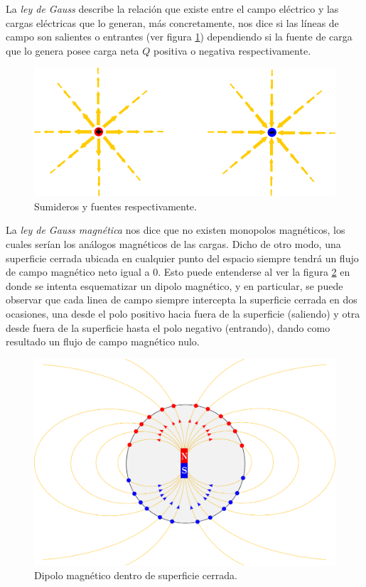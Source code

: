 La \textit{ley de Gauss} describe la relación que existe entre el campo eléctrico y las cargas eléctricas que lo generan, más concretamente, nos dice si las líneas de campo son salientes o entrantes (ver figura \ref{fig:2}) dependiendo si la fuente de carga que lo genera posee carga neta $Q$ positiva o negativa respectivamente.
\begin{figure}[!ht]
\centering
\includegraphics[scale=1]{images/sumidero-fuente.pdf}
\caption[Ley de Gauss]{Sumideros y fuentes respectivamente.}
\label{fig:2}
\end{figure}

La \textit{ley de Gauss magnética} nos dice que no existen monopolos magnéticos, los cuales serían los análogos magnéticos de las cargas. Dicho de otro modo, una superficie cerrada ubicada en cualquier punto del espacio siempre tendrá un flujo de campo magnético neto igual a 0. Esto puede entenderse al ver la figura \ref{fig:3} en donde se intenta esquematizar un dipolo magnético, y en particular, se puede observar que cada linea de campo siempre intercepta la superficie cerrada en dos ocasiones, una desde el polo positivo hacia fuera de la superficie (saliendo) y otra desde fuera de la superficie hasta el polo negativo (entrando), dando como resultado un flujo de campo magnético nulo.
\begin{figure}[!ht]
\centering
\includegraphics[scale=0.7]{images/ley-de-gauss-magnetismo.pdf}
\caption[Ley de Gauss para magnetismo]{Dipolo magnético dentro de superficie cerrada.}
\label{fig:3}
\end{figure}

